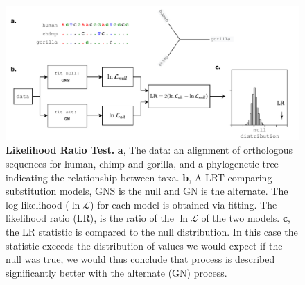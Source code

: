 \begin{figure}[htbp]
\centering
\includegraphics[width=\textwidth]{figures/diagrams/LRT.pdf}
\caption{\textbf{Likelihood Ratio Test.} \textbf{a}, The data: an alignment of orthologous sequences for human, chimp and gorilla, and a phylogenetic tree indicating the relationship between taxa. \textbf{b}, A LRT comparing substitution models, GNS is the null and GN is the alternate. The log-likelihood ($\ln\mathcal{L}$) for each model is obtained via fitting. The likelihood ratio (LR), is the ratio of the $\ln\mathcal{L}$ of the two models. \textbf{c}, the LR statistic is compared to the null distribution. In this case the statistic exceeds the distribution of values we would expect if the null was true, we would thus conclude that process is described significantly better with the alternate (GN) process.}
\label{fig:lrt}
\end{figure}
